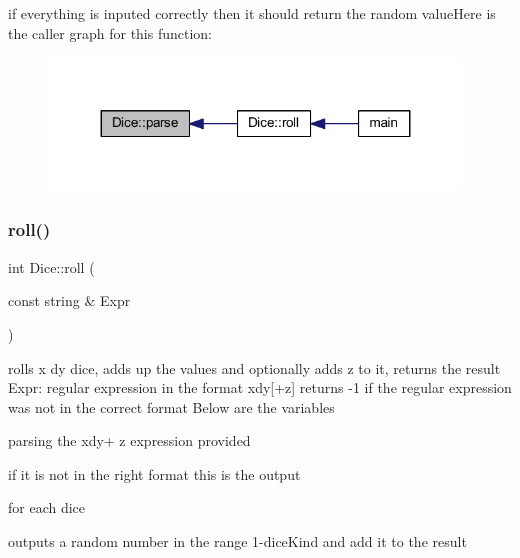 if everything is inputed correctly then it should return the random valueHere is the caller graph for this function\+:\nopagebreak
\begin{figure}[H]
\begin{center}
\leavevmode
\includegraphics[width=311pt]{class_dice_a7fb1c52019fa79aa3b73e6610da9139c_a7fb1c52019fa79aa3b73e6610da9139c_icgraph}
\end{center}
\end{figure}
\hypertarget{class_dice_a4ca42849612d2c9182f1d93deaa4cfb1_a4ca42849612d2c9182f1d93deaa4cfb1}{}\label{class_dice_a4ca42849612d2c9182f1d93deaa4cfb1_a4ca42849612d2c9182f1d93deaa4cfb1} 
\subsubsection{\texorpdfstring{roll()}{roll()}}
{\footnotesize\ttfamily int Dice\+::roll (\begin{DoxyParamCaption}\item[{const string \&}]{Expr }\end{DoxyParamCaption})\hspace{0.3cm}{\ttfamily [static]}}

rolls x dy dice, adds up the values and optionally adds z to it, returns the result Expr\+: regular expression in the format xdy\mbox{[}+z\mbox{]} returns -\/1 if the regular expression was not in the correct format Below are the variables

parsing the xdy+ z expression provided

if it is not in the right format this is the output

for each dice

outputs a random number in the range 1-\/dice\+Kind and add it to the result

